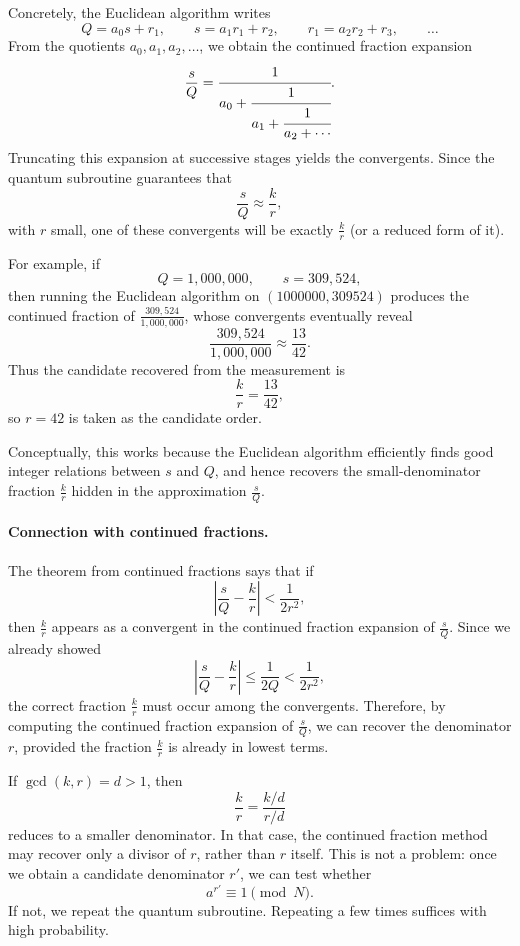 Concretely, the Euclidean algorithm writes
\[
Q = a_0 s + r_1,\qquad
s = a_1 r_1 + r_2,\qquad
r_1 = a_2 r_2 + r_3,\qquad \dots
\]
From the quotients \(a_0,a_1,a_2,\dots\), we obtain the continued fraction expansion
\[
\frac{s}{Q}
=
\cfrac{1}{a_0+\cfrac{1}{a_1+\cfrac{1}{a_2+\cdots}}}.
\]
Truncating this expansion at successive stages yields the convergents. Since the quantum subroutine guarantees that
\[
\frac{s}{Q}\approx \frac{k}{r},
\]
with \(r\) small, one of these convergents will be exactly \(\frac{k}{r}\) (or a reduced form of it).

For example, if
\[
Q=1{,}000{,}000,\qquad s=309{,}524,
\]
then running the Euclidean algorithm on \((1000000,309524)\) produces the continued fraction of \(\frac{309{,}524}{1{,}000{,}000}\), whose convergents eventually reveal
\[
\frac{309{,}524}{1{,}000{,}000}\approx \frac{13}{42}.
\]
Thus the candidate recovered from the measurement is
\[
\frac{k}{r}=\frac{13}{42},
\]
so \(r=42\) is taken as the candidate order.

Conceptually, this works because the Euclidean algorithm efficiently finds good integer relations between \(s\) and \(Q\), and hence recovers the small-denominator fraction \(\frac{k}{r}\) hidden in the approximation \(\frac{s}{Q}\).

\paragraph{Connection with continued fractions.}
The theorem from continued fractions says that if
\[
\left|\frac{s}{Q}-\frac{k}{r}\right|<\frac{1}{2r^2},
\]
then \(\frac{k}{r}\) appears as a convergent in the continued fraction expansion of \(\frac{s}{Q}\). Since we already showed
\[
\left|\frac{s}{Q}-\frac{k}{r}\right|\le \frac{1}{2Q}<\frac{1}{2r^2},
\]
the correct fraction \(\frac{k}{r}\) must occur among the convergents. Therefore, by computing the continued fraction expansion of \(\frac{s}{Q}\), we can recover the denominator \(r\), provided the fraction \(\frac{k}{r}\) is already in lowest terms.

If \(\gcd(k,r)=d>1\), then
\[
\frac{k}{r}=\frac{k/d}{r/d}
\]
reduces to a smaller denominator. In that case, the continued fraction method may recover only a divisor of \(r\), rather than \(r\) itself. This is not a problem: once we obtain a candidate denominator \(r'\), we can test whether
\[
a^{r'}\equiv 1 \pmod N.
\]
If not, we repeat the quantum subroutine. Repeating a few times suffices with high probability.

